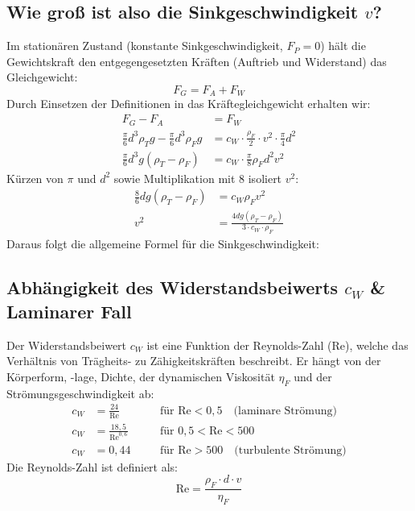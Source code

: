\documentclass[a4paper,10pt,twoside]{article}
\begin{document}
\subsection*{Wie groß ist also die Sinkgeschwindigkeit $v$?}
Im stationären Zustand (konstante Sinkgeschwindigkeit, $F_P = 0$) hält die Gewichtskraft den entgegengesetzten Kräften (Auftrieb und Widerstand) das Gleichgewicht:
\begin{equation}
    F_G = F_A + F_W
\end{equation}
Durch Einsetzen der Definitionen in das Kräftegleichgewicht erhalten wir:
\begin{align*}
    F_G - F_A &= F_W \\
    \frac{\pi}{6} d^3 \rho_T g - \frac{\pi}{6} d^3 \rho_F g &= c_W \cdot \frac{\rho_F}{2} \cdot v^2 \cdot \frac{\pi}{4} d^2 \\
    \frac{\pi}{6} d^3 g (\rho_T - \rho_F) &= c_W \cdot \frac{\pi}{8} \rho_F d^2 v^2
\end{align*}
Kürzen von $\pi$ und $d^2$ sowie Multiplikation mit 8 isoliert $v^2$:
\begin{align*}
    \frac{8}{6} d g (\rho_T - \rho_F) &= c_W \rho_F v^2 \\
    v^2 &= \frac{4 d g (\rho_T - \rho_F)}{3 \cdot c_W \cdot \rho_F}
\end{align*}
Daraus folgt die allgemeine Formel für die Sinkgeschwindigkeit:
\pagebreak
\subsection*{Abhängigkeit des Widerstandsbeiwerts $c_W$ \& Laminarer Fall}
Der Widerstandsbeiwert $c_W$ ist eine Funktion der Reynolds-Zahl ($\text{Re}$), welche das Verhältnis von Trägheits- zu Zähigkeitskräften beschreibt. Er hängt von der Körperform, -lage, Dichte, der dynamischen Viskosität $\eta_F$ und der Strömungsgeschwindigkeit ab:
\begin{align*}
    c_W &= \frac{24}{\text{Re}} \quad &&\text{für } \text{Re} < 0{,}5 \quad \text{(laminare Strömung)} \\
    c_W &= \frac{18{,}5}{\text{Re}^{0{,}6}} \quad &&\text{für } 0{,}5 < \text{Re} < 500 \\
    c_W &= 0{,}44 \quad &&\text{für } \text{Re} > 500 \quad \text{(turbulente Strömung)}
\end{align*}
\ppbig
Die Reynolds-Zahl ist definiert als:
\begin{equation}
    \text{Re} = \frac{\rho_F \cdot d \cdot v}{\eta_F}
\end{equation}
\end{document}
